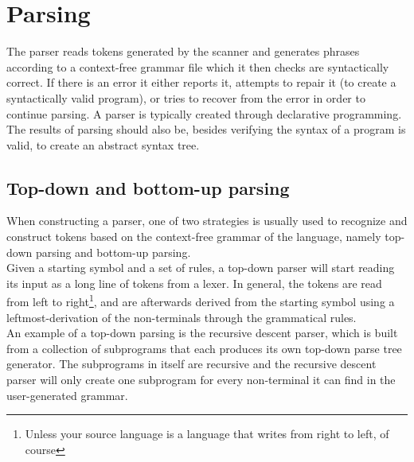 \section{Parsing}
The parser reads tokens generated by the scanner and generates phrases according to a context-free grammar file which it then checks are syntactically correct. If there is an error it either reports it, attempts to repair it (to create a syntactically valid program), or tries to recover from the error in order to continue parsing. A parser is typically created through declarative programming. The results of parsing should also be, besides verifying the syntax of a program is valid, to create an abstract syntax tree.



\subsection*{Top-down and bottom-up parsing}
When constructing a parser, one of two strategies is usually used to recognize and construct tokens based on the context-free grammar of the language, namely top-down parsing and bottom-up parsing.\\

Given a starting symbol and a set of rules, a top-down parser will start reading its input as a long line of tokens from a lexer. In general, the tokens are read from left to right\footnote{Unless your source language is a language that writes from right to left, of course}, and are afterwards derived from the starting symbol using a leftmost-derivation of the non-terminals through the grammatical rules\cite{conceptsOfProgrammingLanguages}.\\

An example of a top-down parsing is the recursive descent parser, which is built from a collection of subprograms that each produces its own top-down parse tree generator. The subprograms in itself are recursive and the recursive descent parser will only create one subprogram for every non-terminal it can find in the user-generated grammar\cite{conceptsOfProgrammingLanguages}.\\

